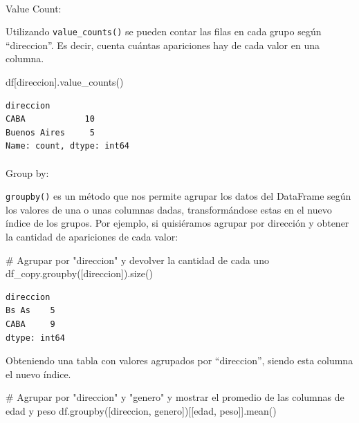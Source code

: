 \documentclass[
  letterpaper,
  DIV=11,
  numbers=noendperiod]{scrreprt}
\makeatletter
\let\oldparagraph\paragraph
\renewcommand{\paragraph}{
    \@ifstar
      \xxxParagraphStar
      \xxxParagraphNoStar
  }
\newcommand{\xxxParagraphStar}[1]{\oldparagraph*{#1}\mbox{}}
\newcommand{\xxxParagraphNoStar}[1]{\oldparagraph{#1}\mbox{}}
\newenvironment{Shaded}{\begin{snugshade}}{\end{snugshade}}
\newcommand{\CommentTok}[1]{\textcolor[rgb]{0.37,0.37,0.37}{#1}}
\newcommand{\NormalTok}[1]{\textcolor[rgb]{0.00,0.23,0.31}{#1}}
\newcommand{\StringTok}[1]{\textcolor[rgb]{0.13,0.47,0.30}{#1}}
\makeatother
\begin{document}
\paragraph{Value Count:}\label{value-count}

Utilizando \texttt{value\_counts()} se pueden contar las filas en cada
grupo según ``direccion''. Es decir, cuenta cuántas apariciones hay de
cada valor en una columna.

\begin{Shaded}
\begin{Highlighting}[]
\NormalTok{df[}\StringTok{\textquotesingle{}direccion\textquotesingle{}}\NormalTok{].value\_counts()}
\end{Highlighting}
\end{Shaded}

\begin{verbatim}
direccion
CABA            10
Buenos Aires     5
Name: count, dtype: int64
\end{verbatim}

\paragraph{Group by:}\label{group-by}

\texttt{groupby()} es un método que nos permite agrupar los datos del
DataFrame según los valores de una o unas columnas dadas,
transformándose estas en el nuevo índice de los grupos. Por ejemplo, si
quisiéramos agrupar por dirección y obtener la cantidad de apariciones
de cada valor:

\begin{Shaded}
\begin{Highlighting}[]
\CommentTok{\# Agrupar por "direccion" y devolver la cantidad de cada uno}
\NormalTok{df\_copy.groupby([}\StringTok{\textquotesingle{}direccion\textquotesingle{}}\NormalTok{]).size()}
\end{Highlighting}
\end{Shaded}

\begin{verbatim}
direccion
Bs As    5
CABA     9
dtype: int64
\end{verbatim}

Obteniendo una tabla con valores agrupados por ``direccion'', siendo
esta columna el nuevo índice.

\begin{Shaded}
\begin{Highlighting}[]
\CommentTok{\# Agrupar por "direccion" y "genero" y mostrar el promedio de las columnas de \textquotesingle{}edad\textquotesingle{} y \textquotesingle{}peso\textquotesingle{}}
\NormalTok{df.groupby([}\StringTok{\textquotesingle{}direccion\textquotesingle{}}\NormalTok{, }\StringTok{\textquotesingle{}genero\textquotesingle{}}\NormalTok{])[[}\StringTok{\textquotesingle{}edad\textquotesingle{}}\NormalTok{, }\StringTok{\textquotesingle{}peso\textquotesingle{}}\NormalTok{]].mean()}
\end{Highlighting}
\end{Shaded}
\end{document}
